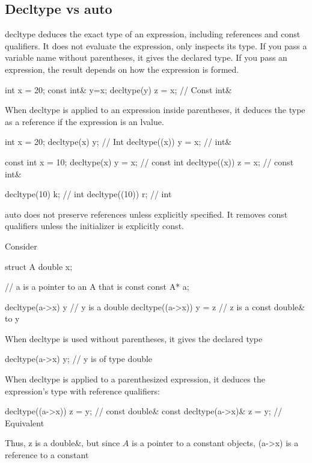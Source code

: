 \documentclass{report}
\begin{document}
 \subsection{Decltype vs auto}
 \bigbreak \noindent 
 decltype deduces the exact type of an expression, including references and const qualifiers. It does not evaluate the expression, only inspects its type. If you pass a variable name without parentheses, it gives the declared type. If you pass an expression, the result depends on how the expression is formed.
 \bigbreak \noindent 
 \begin{cppcode}
 int x = 20;
 const int& y=x;
 decltype(y) z = x; // Const int&
 \end{cppcode}
 \bigbreak \noindent 
 When decltype is applied to an expression inside parentheses, it deduces the type as a reference if the expression is an lvalue.
 \bigbreak \noindent 
 \begin{cppcode}
 int x = 20;
 decltype(x) y; // Int
 decltype((x)) y = x; // int&

 const int x = 10;
 decltype(x) y = x; // const int
 decltype((x)) z = x; // const int&

 decltype(10) k; // int
 decltype((10)) r; // int
 \end{cppcode}

 \bigbreak \noindent 
 auto does not preserve references unless explicitly specified. It removes const qualifiers unless the initializer is explicitly const.
 



 \bigbreak \noindent 
 Consider
 \bigbreak \noindent 
 \begin{cppcode}
     struct A {
         double x;
     }

     // a is a pointer to an A that is const
     const A* a;

     decltype(a->x) y // y is a double
     decltype((a->x)) y = z // z is a const double& to y
 \end{cppcode}
 \bigbreak \noindent 
 When decltype is used without parentheses, it gives the declared type
 \bigbreak \noindent 
 \begin{cppcode}
     decltype(a->x) y;  // y is of type double
 \end{cppcode}
 \bigbreak \noindent 
 When decltype is applied to a parenthesized expression, it deduces the expression's type with reference qualifiers:
 \bigbreak \noindent 
 \begin{cppcode}
    decltype((a->x)) z = y; // const double& 
    const decltype(a->x)& z = y; // Equivalent
 \end{cppcode}
 \bigbreak \noindent 
 Thus, z is a double\&, but since $A$ is a pointer to a constant objects, (a->x) is a reference to a constant
\end{document}
